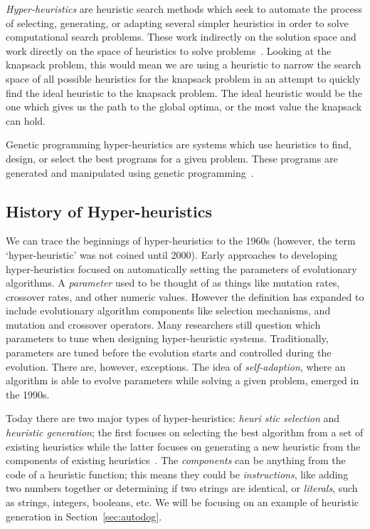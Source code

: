 \documentclass{sig-alternate}
\begin{document}
\textit{Hyper-heuristics} are heuristic search methods which seek to automate the process of selecting, generating, or adapting several simpler heuristics in order to solve computational search problems. These work indirectly on the solution space and work directly on the space of heuristics to solve problems~\cite{tauritz:tutorial}. Looking at the knapsack problem, this would mean we are using a heuristic to narrow the search space of all possible heuristics for the knapsack problem in an attempt to quickly find the ideal heuristic to the knapsack problem. The ideal heuristic would be the one which gives us the path to the global optima, or the most value the knapsack can hold.

Genetic programming hyper-heuristics are systems which use heuristics to find, design, or select the best programs for a given problem. These programs are generated and manipulated using genetic programming~\cite{harris:2015}.

\subsection{History of Hyper-heuristics}
\label{sec:history}
We can trace the beginnings of hyper-heuristics to the 1960s (however, the term `hyper-heuristic' was not coined until 2000). Early approaches to developing hyper-heuristics focused on automatically setting the parameters of evolutionary algorithms. A \textit{parameter} used to be thought of as things like mutation rates, crossover rates, and other numeric values. However the definition has expanded to include evolutionary algorithm components like selection mechanisms, and mutation and crossover operators. Many researchers still question which parameters to tune when designing hyper-heuristic systems. Traditionally, parameters are tuned before the evolution starts and controlled during the evolution. There are, however, exceptions. The idea of \textit{self-adaption}, where an algorithm is able to evolve parameters while solving a given problem, emerged in the 1990s.~\cite{pappa:2014}

Today there are two major types of hyper-heuristics: \textit{heuri\- stic selection} and \textit{heuristic generation}; the first focuses on selecting the best algorithm from a set of existing heuristics while the latter focuses on generating a new heuristic from the components of existing heuristics~\cite{pappa:2014}. The \textit{components} can be anything from the code of a heuristic function; this means they could be \textit{instructions}, like adding two numbers together or determining if two strings are identical, or \textit{literals}, such as strings, integers, booleans, etc. We will be focusing on an example of heuristic generation in Section~\ref{sec:autodog}.
\end{document}
